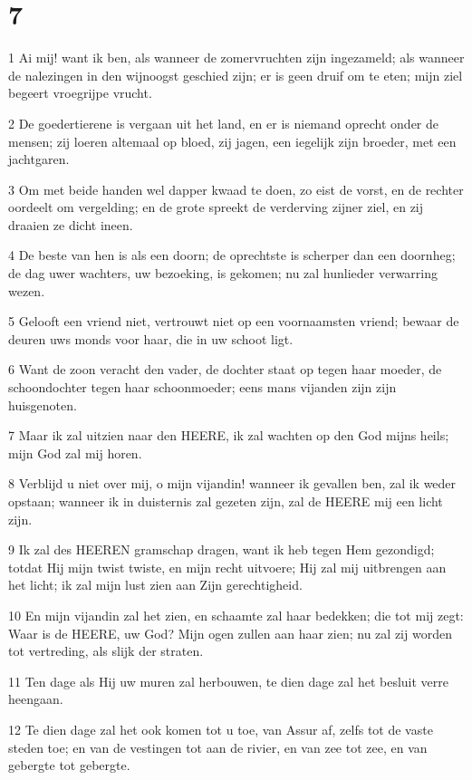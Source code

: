\chapter{7}

\par 1 Ai mij! want ik ben, als wanneer de zomervruchten zijn ingezameld; als wanneer de nalezingen in den wijnoogst geschied zijn; er is geen druif om te eten; mijn ziel begeert vroegrijpe vrucht.
\par 2 De goedertierene is vergaan uit het land, en er is niemand oprecht onder de mensen; zij loeren altemaal op bloed, zij jagen, een iegelijk zijn broeder, met een jachtgaren.
\par 3 Om met beide handen wel dapper kwaad te doen, zo eist de vorst, en de rechter oordeelt om vergelding; en de grote spreekt de verderving zijner ziel, en zij draaien ze dicht ineen.
\par 4 De beste van hen is als een doorn; de oprechtste is scherper dan een doornheg; de dag uwer wachters, uw bezoeking, is gekomen; nu zal hunlieder verwarring wezen.
\par 5 Gelooft een vriend niet, vertrouwt niet op een voornaamsten vriend; bewaar de deuren uws monds voor haar, die in uw schoot ligt.
\par 6 Want de zoon veracht den vader, de dochter staat op tegen haar moeder, de schoondochter tegen haar schoonmoeder; eens mans vijanden zijn zijn huisgenoten.
\par 7 Maar ik zal uitzien naar den HEERE, ik zal wachten op den God mijns heils; mijn God zal mij horen.
\par 8 Verblijd u niet over mij, o mijn vijandin! wanneer ik gevallen ben, zal ik weder opstaan; wanneer ik in duisternis zal gezeten zijn, zal de HEERE mij een licht zijn.
\par 9 Ik zal des HEEREN gramschap dragen, want ik heb tegen Hem gezondigd; totdat Hij mijn twist twiste, en mijn recht uitvoere; Hij zal mij uitbrengen aan het licht; ik zal mijn lust zien aan Zijn gerechtigheid.
\par 10 En mijn vijandin zal het zien, en schaamte zal haar bedekken; die tot mij zegt: Waar is de HEERE, uw God? Mijn ogen zullen aan haar zien; nu zal zij worden tot vertreding, als slijk der straten.
\par 11 Ten dage als Hij uw muren zal herbouwen, te dien dage zal het besluit verre heengaan.
\par 12 Te dien dage zal het ook komen tot u toe, van Assur af, zelfs tot de vaste steden toe; en van de vestingen tot aan de rivier, en van zee tot zee, en van gebergte tot gebergte.
